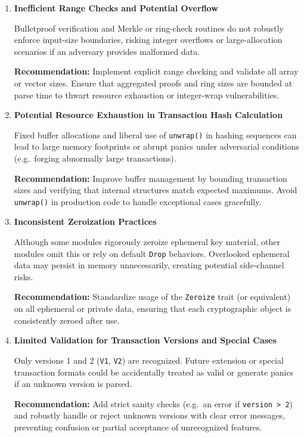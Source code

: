 \documentclass[12pt,a4paper]{article}
\begin{document}
\begin{enumerate}
    \item \textbf{Inefficient Range Checks and Potential Overflow}

    Bulletproof verification and Merkle or ring-check routines do not robustly enforce input-size boundaries, risking integer overflows or large-allocation scenarios if an adversary provides malformed data.

    \textbf{Recommendation:}
    Implement explicit range checking and validate all array or vector sizes. Ensure that aggregated proofs and ring sizes are bounded at parse time to thwart resource exhaustion or integer-wrap vulnerabilities.

    \item \textbf{Potential Resource Exhaustion in Transaction Hash Calculation}

    Fixed buffer allocations and liberal use of \texttt{unwrap()} in hashing sequences can lead to large memory footprints or abrupt panics under adversarial conditions (e.g.\ forging abnormally large transactions).

    \textbf{Recommendation:}
    Improve buffer management by bounding transaction sizes and verifying that internal structures match expected maximums. Avoid \texttt{unwrap()} in production code to handle exceptional cases gracefully.

    \item \textbf{Inconsistent Zeroization Practices}

    Although some modules rigorously zeroize ephemeral key material, other modules omit this or rely on default \texttt{Drop} behaviors. Overlooked ephemeral data may persist in memory unnecessarily, creating potential side-channel risks.

    \textbf{Recommendation:}
    Standardize usage of the \texttt{Zeroize} trait (or equivalent) on all ephemeral or private data, ensuring that each cryptographic object is consistently zeroed after use.

    \item \textbf{Limited Validation for Transaction Versions and Special Cases}

    Only versions 1 and 2 (\texttt{V1}, \texttt{V2}) are recognized. Future extension or special transaction formats could be accidentally treated as valid or generate panics if an unknown version is parsed.

    \textbf{Recommendation:}
    Add strict sanity checks (e.g.\ an error if \texttt{version > 2}) and robustly handle or reject unknown versions with clear error messages, preventing confusion or partial acceptance of unrecognized features.
\end{enumerate}
\end{document}
